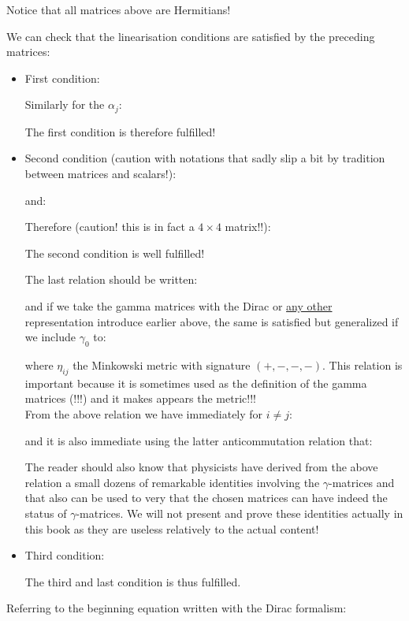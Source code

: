 	\begin{tcolorbox}[title=Remark,colframe=black,arc=10pt]
	Notice that all matrices above are Hermitians!
	\end{tcolorbox}
	We can check that the linearisation conditions are satisfied by the preceding matrices:
	\begin{itemize}
		\item First condition:
		
		Similarly for the $\alpha_j$:
		
		The first condition is therefore fulfilled!
	
		\item Second condition (caution with notations that sadly slip a bit by tradition between matrices and scalars!):
		
		and:
		
		Therefore (caution! this is in fact a $4\times 4$ matrix!!):
		
		The second condition is well fulfilled!
		\begin{tcolorbox}[title=Remark,colframe=black,arc=10pt]
		\label{gamma anticommutation relations}The last relation should be written:
		
		and if we take the gamma matrices with the Dirac or \underline{any other} representation introduce earlier above, the same is satisfied but generalized if we include $\gamma_0$ to:
		
		where $\eta_{ij}$ the Minkowski metric with signature $(+, -, -, -)$. This relation is important because it is sometimes used as the definition of the gamma matrices (!!!) and it makes appears the metric!!!\\
		
		From the above relation we have immediately for $i\neq j$:
		
		and it is also immediate using the latter anticommutation relation that:
		
		The reader should also know that physicists have derived from the above relation a small dozens of remarkable identities involving the $\gamma$-matrices and that also can be used to very that the chosen matrices can have indeed the status of $\gamma$-matrices. We will not present and prove these identities actually in this book as they are useless relatively to the actual content!
		\end{tcolorbox}
		
		\item Third condition:
		
		The third and last condition is thus fulfilled.
	\end{itemize}
	Referring to the beginning equation written with the Dirac formalism:
	
